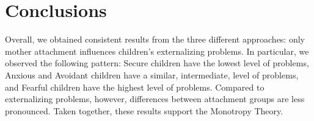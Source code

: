 \documentclass[
]{book}
\begin{document}
\hypertarget{conclusion-int}{%
\chapter{Conclusions}\label{conclusion-int}}

Overall, we obtained consistent results from the three different approaches: only mother attachment influences children's externalizing problems. In particular, we observed the following pattern: Secure children have the lowest level of problems, Anxious and Avoidant children have a similar, intermediate, level of problems, and Fearful children have the highest level of problems. Compared to externalizing problems, however, differences between attachment groups are less pronounced. Taken together, these results support the Monotropy Theory.

  
\end{document}

